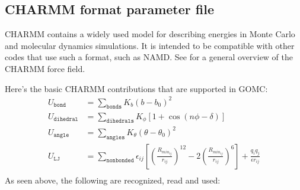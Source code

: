 \documentclass[letterpaper,10pt,english]{sphinxmanual}
\begin{document}
\subsection{CHARMM format parameter file}
\label{\detokenize{input_file:charmm-format-parameter-file}}
CHARMM contains a widely used model for describing energies in Monte Carlo and molecular dynamics simulations. It is intended to be compatible with other codes that use such a format, such as NAMD. See  for a general overview of the CHARMM force field.

Here’s the basic CHARMM contributions that are supported in GOMC:
\begin{equation*}
\begin{split}U_{\texttt{bond}}&=\sum_{\texttt{bonds}} K_b(b-b_0)^2\\
U_{\texttt{dihedral}}&=\sum_{\texttt{dihedrals}} K_{\phi} [1+\cos(n\phi - \delta)]\\
U_{\texttt{angle}}&=\sum_{\texttt{angles}} K_{\theta}(\theta-\theta_0)^2\\
U_{\texttt{LJ}}&=\sum_{\texttt{nonbonded}} \epsilon_{ij}\left[\left(\frac{R_{min_{ij}}}{r_{ij}}\right)^{12}-2\left(\frac{R_{min_{ij}}}{r_{ij}}\right)^6\right]+ \frac{q_i q_j}{\epsilon r_{ij}} \\\end{split}
\end{equation*}
As seen above, the following are recognized, read and used:
\end{document}
